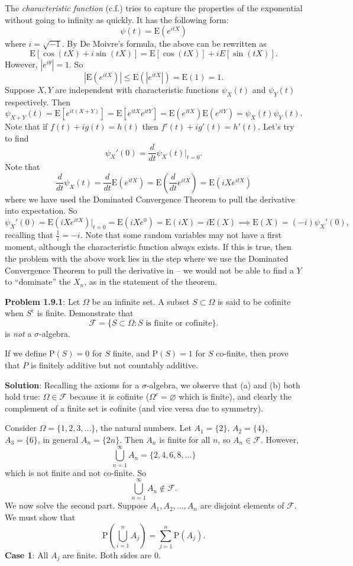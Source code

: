 \documentclass[english,12pt]{article}
\theoremstyle{plain}
\theoremstyle{definition}
\theoremstyle{definition} %
\begin{document}
The \emph{characteristic function} (c.f.) tries to capture the properties of the exponential without going to infinity as quickly. It has the following form:
\[ \psi(t) = \text{E} \left( e^{itX} \right) \]
where $i=\sqrt{-1}$. By De Moivre's formula, the above can be rewritten as
\[ \text{E}[ \cos(tX) + i \sin(tX) ] = \text{E}[ \cos(tX) ] + i E[ \sin(tX) ]. \]
However, $|e^{i \theta}| = 1$. So
\[ |\text{E}(e^{itX})| \leq \text{E} \left( |e^{itX}| \right) = \text{E}(1) = 1. \]
Suppose $X,Y$ are independent with characteristic functions $\psi_X(t)$ and $\psi_Y(t)$ respectively. Then
\[ \psi_{X+Y}(t) = \text{E}[e^{it(X+Y)}] = \text{E}[e^{itX} e^{itY}] = \text{E}(e^{itX}) \text{E}(e^{itY}) = \psi_X(t) \psi_Y(t). \]
Note that if $f(t) + i g(t) = h(t)$ then $f'(t) + i g'(t) = h'(t)$. Let's try to find
\[ \psi_X'(0) = \frac{d}{dt} \psi_X(t) \Bigg|_{t = 0}. \]
Note that
\[ \frac{d}{dt} \psi_X(t) = \frac{d}{dt} \text{E}( e^{itX} ) = \text{E} \left( \frac{d}{dt} e^{itX} \right) = \text{E}(iX e^{itX} ) \]
where we have used the Dominated Convergence Theorem to pull the derivative into expectation. So
\[ \psi_X'(0) = \text{E}(iX e^{itX} ) \Bigg|_{t=0} = \text{E}(iX e^{0} ) = \text{E}(iX) = i\text{E}(X) \implies \text{E}(X) = (-i) \psi_X'(0), \]
recalling that $\frac{1}{i} = -i$. Note that some random variables may not have a first moment, although the characteristic function always exists. If this is true, then the problem with the above work lies in the step where we use the Dominated Convergence Theorem to pull the derivative in -- we would not be able to find a $Y$ to ``dominate'' the $X_n$, as in the statement of the theorem.

\textbf{Problem 1.9.1}: Let $\Omega$ be an infinite set. A subset $S \subset \Omega$ is said to be cofinite when $S^c$ is finite. Demonstrate that
\[ \mathcal{F} = \{ S \subset \Omega : S \text{ is finite or cofinite} \}. \]
is \emph{not} a $\sigma$-algebra.

If we define $\text{P}(S) = 0$ for $S$ finite, and $\text{P}(S) = 1$ for $S$ co-finite, then prove that $P$ is finitely additive but not countably additive.

\textbf{Solution}: Recalling the axioms for a $\sigma$-algebra, we observe that (a) and (b) both hold true: $\Omega \in \mathcal{F}$ because it is cofinite ($\Omega^c = \varnothing$ which is finite), and clearly the complement of a finite set is cofinite (and vice versa due to symmetry).

Consider $\Omega = \{1,2,3, \ldots\}$, the natural numbers. Let $A_1 = \{ 2 \}$, $A_2 = \{ 4 \}$, $A_3 = \{ 6 \}$, in general $A_n = \{ 2n \}$. Then $A_n$ is finite for all $n$, so $A_n \in \mathcal{F}$. However,
\[ \bigcup_{n=1}^\infty A_n = \{ 2, 4, 6, 8, \ldots \} \]
which is not finite and not co-finite. So 
\[ \bigcup_{n=1}^\infty A_n \notin \mathcal{F}. \]
We now solve the second part. Suppose $A_1, A_2, \ldots, A_n$ are disjoint elements of $\mathcal{F}$. We must show that
\[ \text{P} \left( \bigcup_{i=1}^n A_j \right) = \sum_{j=1}^n \text{P}(A_j). \]
\textbf{Case 1}: All $A_j$ are finite. Both sides are 0.
\end{document}
